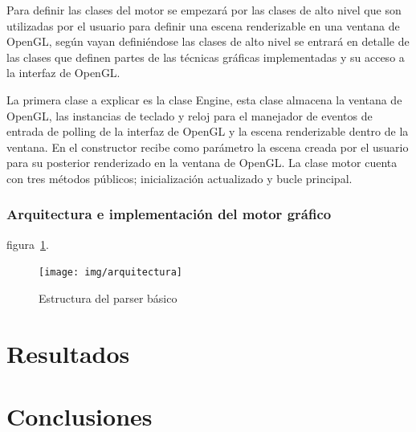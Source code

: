 \documentclass[a4paper, 17pt]{book}
\begin{document}
Para definir las clases del motor se empezará por las clases de alto nivel que son utilizadas por el usuario para definir una
escena renderizable en una ventana de OpenGL, según vayan definiéndose las clases de alto nivel se entrará en detalle de las
clases que definen partes de las técnicas gráficas implementadas y su acceso a la interfaz de OpenGL.

La primera clase a explicar es la clase Engine, esta clase almacena la ventana de OpenGL, las instancias de teclado y reloj
para el manejador de eventos de entrada de polling de la interfaz de OpenGL y la escena renderizable dentro de la ventana.
En el constructor recibe como parámetro la escena creada por el usuario para su posterior renderizado en la ventana de OpenGL.
La clase motor cuenta con tres métodos públicos; inicialización actualizado y bucle principal.



\subsection{Arquitectura e implementación del motor gráfico} 
\label{sec:arquitectura}


figura~\ref{fig:arquitectura}.

\begin{figure}
  \centering
  \texttt{[image: img/arquitectura]}
  \caption{Estructura del parser básico}
  \label{fig:arquitectura}
\end{figure}



\cleardoublepage
\chapter{Resultados}





\cleardoublepage
\chapter{Conclusiones}
\label{chap:conclusiones}
\end{document}

